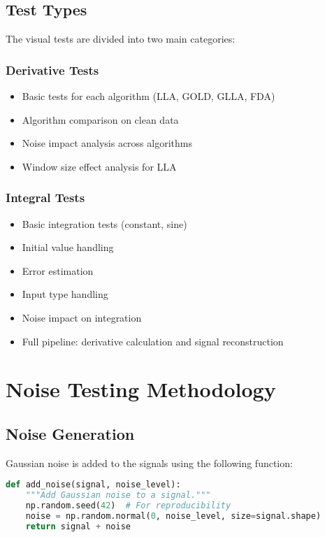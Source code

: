 \documentclass{article}
\begin{document}
\subsection{Test Types}

The visual tests are divided into two main categories:

\subsubsection{Derivative Tests}
\begin{itemize}
    \item Basic tests for each algorithm (LLA, GOLD, GLLA, FDA)
    \item Algorithm comparison on clean data
    \item Noise impact analysis across algorithms
    \item Window size effect analysis for LLA
\end{itemize}

\subsubsection{Integral Tests}
\begin{itemize}
    \item Basic integration tests (constant, sine)
    \item Initial value handling
    \item Error estimation
    \item Input type handling
    \item Noise impact on integration
    \item Full pipeline: derivative calculation and signal reconstruction
\end{itemize}

\section{Noise Testing Methodology}

\subsection{Noise Generation}

Gaussian noise is added to the signals using the following function:

\begin{lstlisting}[language=Python]
def add_noise(signal, noise_level):
    """Add Gaussian noise to a signal."""
    np.random.seed(42)  # For reproducibility
    noise = np.random.normal(0, noise_level, size=signal.shape)
    return signal + noise
\end{lstlisting}
\end{document}
